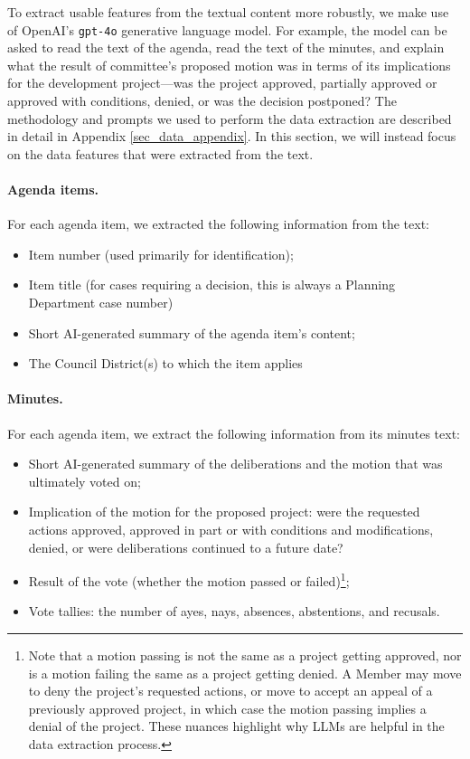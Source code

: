To extract usable features from the textual content more robustly, we make use of OpenAI's \texttt{gpt-4o} generative language model. For example, the model can be asked to read the text of the agenda, read the text of the minutes, and explain what the result of committee's proposed motion was in terms of its implications for the development project---was the project approved, partially approved or approved with conditions, denied, or was the decision postponed? The methodology and prompts we used to perform the data extraction are described in detail in Appendix \ref{sec_data_appendix}. In this section, we will instead focus on the data features that were extracted from the text.

\paragraph{Agenda items.} For each agenda item, we extracted the following information from the text: 
\begin{itemize}[noitemsep, topsep=0pt]
\item Item number (used primarily for identification);
\item Item title (for cases requiring a decision, this is always a Planning Department case number)
\item Short AI-generated summary of the agenda item's content;
\item The Council District(s) to which the item applies
\end{itemize}

\paragraph{Minutes.} For each agenda item, we extract the following information from its minutes text:
\begin{itemize}[noitemsep, topsep=0pt]
\item Short AI-generated summary of the deliberations and the motion that was ultimately voted on;
\item Implication of the motion for the proposed project: were the requested actions approved, approved in part or with conditions and modifications, denied, or were deliberations continued to a future date?
\item Result of the vote (whether the motion passed or failed)\footnote{Note that a motion passing is not the same as a project getting approved, nor is a motion failing the same as a project getting denied. A Member may move to deny the project's requested actions, or move to accept an appeal of a previously approved project, in which case the motion passing implies a denial of the project. These nuances highlight why LLMs are helpful in the data extraction process.};
\item Vote tallies: the number of ayes, nays, absences, abstentions, and recusals.
\end{itemize}

